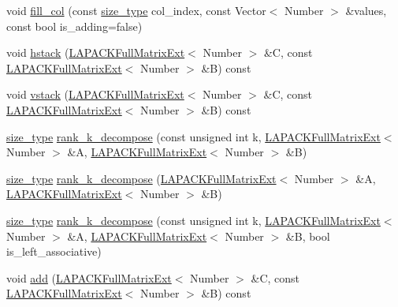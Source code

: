 \begin{DoxyCompactItemize}
\item 
void \hyperlink{classLAPACKFullMatrixExt_a497a2e73b69f5b07cedb729330e95667}{fill\+\_\+col} (const \hyperlink{classLAPACKFullMatrixExt_a5cf5f4a6104dc17029210b5ca52bf574}{size\+\_\+type} col\+\_\+index, const Vector$<$ Number $>$ \&values, const bool is\+\_\+adding=false)
\item 
void \hyperlink{classLAPACKFullMatrixExt_aeeae2d2698007889a47f192043adb75c}{hstack} (\hyperlink{classLAPACKFullMatrixExt}{L\+A\+P\+A\+C\+K\+Full\+Matrix\+Ext}$<$ Number $>$ \&C, const \hyperlink{classLAPACKFullMatrixExt}{L\+A\+P\+A\+C\+K\+Full\+Matrix\+Ext}$<$ Number $>$ \&B) const
\item 
void \hyperlink{classLAPACKFullMatrixExt_a0f315932c3729240d03bc941bb2de849}{vstack} (\hyperlink{classLAPACKFullMatrixExt}{L\+A\+P\+A\+C\+K\+Full\+Matrix\+Ext}$<$ Number $>$ \&C, const \hyperlink{classLAPACKFullMatrixExt}{L\+A\+P\+A\+C\+K\+Full\+Matrix\+Ext}$<$ Number $>$ \&B) const
\item 
\hyperlink{classLAPACKFullMatrixExt_a5cf5f4a6104dc17029210b5ca52bf574}{size\+\_\+type} \hyperlink{classLAPACKFullMatrixExt_ab28877de241a7f5f901fa612c6352ce9}{rank\+\_\+k\+\_\+decompose} (const unsigned int k, \hyperlink{classLAPACKFullMatrixExt}{L\+A\+P\+A\+C\+K\+Full\+Matrix\+Ext}$<$ Number $>$ \&A, \hyperlink{classLAPACKFullMatrixExt}{L\+A\+P\+A\+C\+K\+Full\+Matrix\+Ext}$<$ Number $>$ \&B)
\item 
\hyperlink{classLAPACKFullMatrixExt_a5cf5f4a6104dc17029210b5ca52bf574}{size\+\_\+type} \hyperlink{classLAPACKFullMatrixExt_af4406db24d0924c5f7e891336bfbcffe}{rank\+\_\+k\+\_\+decompose} (\hyperlink{classLAPACKFullMatrixExt}{L\+A\+P\+A\+C\+K\+Full\+Matrix\+Ext}$<$ Number $>$ \&A, \hyperlink{classLAPACKFullMatrixExt}{L\+A\+P\+A\+C\+K\+Full\+Matrix\+Ext}$<$ Number $>$ \&B)
\item 
\hyperlink{classLAPACKFullMatrixExt_a5cf5f4a6104dc17029210b5ca52bf574}{size\+\_\+type} \hyperlink{classLAPACKFullMatrixExt_aba252fd1854009998639c21c969909d8}{rank\+\_\+k\+\_\+decompose} (const unsigned int k, \hyperlink{classLAPACKFullMatrixExt}{L\+A\+P\+A\+C\+K\+Full\+Matrix\+Ext}$<$ Number $>$ \&A, \hyperlink{classLAPACKFullMatrixExt}{L\+A\+P\+A\+C\+K\+Full\+Matrix\+Ext}$<$ Number $>$ \&B, bool is\+\_\+left\+\_\+associative)
\item 
void \hyperlink{classLAPACKFullMatrixExt_a824a7a919666c8af3df5723175f6201e}{add} (\hyperlink{classLAPACKFullMatrixExt}{L\+A\+P\+A\+C\+K\+Full\+Matrix\+Ext}$<$ Number $>$ \&C, const \hyperlink{classLAPACKFullMatrixExt}{L\+A\+P\+A\+C\+K\+Full\+Matrix\+Ext}$<$ Number $>$ \&B) const

\end{DoxyCompactItemize}
